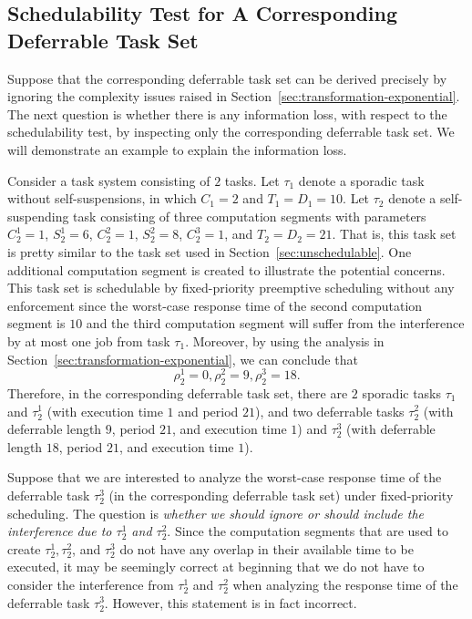 \subsection{Schedulability Test for A Corresponding Deferrable Task Set}
\label{sec:schedulability-test-deferrable}

Suppose that the corresponding deferrable task set can be derived precisely by ignoring the complexity issues raised in Section~\ref{sec:transformation-exponential}. The next question is whether there is any information loss, with respect to the schedulability test, by inspecting only the corresponding deferrable task set. We will demonstrate an example to explain the information loss.

Consider a task system consisting of $2$ tasks. Let $\tau_1$ denote a sporadic task without self-suspensions, in which $C_1 = 2$ and $T_1=D_1=10$. Let $\tau_2$ denote a self-suspending task consisting of three computation segments with parameters  $C_2^1 = 1$,  $S_2^1 = 6$, $C_2^2=1$, $S_2^2=8$, $C_2^3=1$, and $ T_2=D_2=21$. That is, this task set is pretty similar to the task set used in Section~\ref{sec:unschedulable}. One additional computation
segment is created to illustrate the potential concerns. This task set is schedulable by fixed-priority preemptive scheduling without any enforcement since the worst-case response time of the second computation segment is $10$ and the third computation segment will suffer from the interference by at most one job from task $\tau_1$. Moreover, by using the analysis in Section~\ref{sec:transformation-exponential}, we can conclude that
\begin{equation*}
  \rho_2^1 = 0, \rho_2^2 = 9, \rho_2^3 = 18.
\end{equation*}
Therefore, in the corresponding deferrable task set, there are $2$ sporadic tasks $\tau_1$ and $\tau_2^1$ (with execution time $1$ and period $21$), and two deferrable tasks $\tau_2^2$ (with deferrable length $9$, period $21$, and execution time $1$) and $\tau_2^3$ (with deferrable length $18$, period $21$, and execution time $1$).  

Suppose that we are interested to analyze the worst-case response time of the deferrable task $\tau_2^3$ (in the corresponding deferrable task set) under fixed-priority scheduling. The question is \emph{whether we should ignore or should include the interference due to $\tau_2^1$ and $\tau_2^2$}.
Since the computation segments that are used to create $\tau_2^1, \tau_2^2$, and $\tau_2^3$ do not have any overlap in their available time to be executed, it may be seemingly correct at beginning that we do not have to consider the interference from $\tau_2^1$ and $\tau_2^2$ when analyzing the response time of the deferrable task $\tau_2^3$. However, this statement is in fact incorrect.


